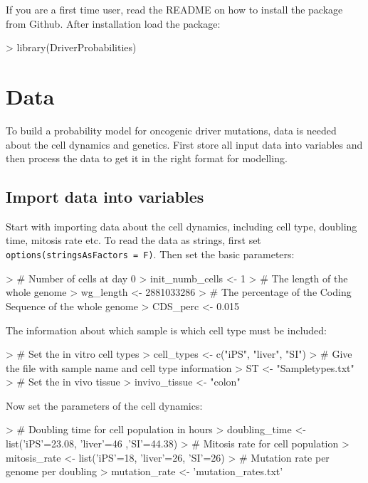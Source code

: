 \documentclass{article}
\begin{document}
If you are a first time user, read the README on how to install the package 
from Github. After installation load the package:



\begin{Schunk}
\begin{Sinput}
> library(DriverProbabilities)
\end{Sinput}
\end{Schunk}

\section{Data}

To build a probability model for oncogenic driver mutations, data is needed 
about the cell dynamics and genetics. First store all input data into variables
and then process the data to get it in the right format for modelling.

\subsection{Import data into variables}
Start with importing data about the cell dynamics, including cell type, 
doubling time, mitosis rate etc. To read the data as strings, first set
\texttt{options(stringsAsFactors = F)}. Then set the basic parameters:

\begin{Schunk}
\begin{Sinput}
> # Number of cells at day 0
> init_numb_cells <- 1
> # The length of the whole genome
> wg_length <- 2881033286
> # The percentage of the Coding Sequence of the whole genome
> CDS_perc <- 0.015
\end{Sinput}
\end{Schunk}

The information about which sample is which cell type must be included:
\begin{Schunk}
\begin{Sinput}
> # Set the in vitro cell types
> cell_types <- c("iPS", "liver", "SI")
> # Give the file with sample name and cell type information
> ST <- "Sampletypes.txt"
> # Set the in vivo tissue
> invivo_tissue <- "colon"
\end{Sinput}
\end{Schunk}

Now set the parameters of the cell dynamics:

\begin{Schunk}
\begin{Sinput}
> # Doubling time for cell population in hours
> doubling_time <- list('iPS'=23.08, 'liver'=46 ,'SI'=44.38)
> # Mitosis rate for cell population
> mitosis_rate <- list('iPS'=18, 'liver'=26, 'SI'=26)
> # Mutation rate per genome per doubling
> mutation_rate <- 'mutation_rates.txt'
\end{Sinput}
\end{Schunk}
\end{document}
